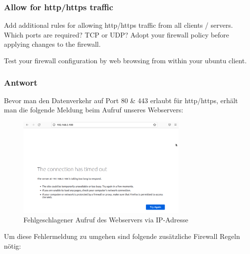 \documentclass{article}
\begin{document}
\subsubsection{Allow for http/https traffic}

Add additional rules for allowing http/https traffic from all clients / servers. 
Which ports are required? TCP or UDP? Adopt your firewall policy before applying 
changes to the firewall.

Test your firewall configuration by web browsing from within your ubuntu client. 

\subsubsection*{Antwort}

Bevor man den Datenverkehr auf Port 80 \& 443 erlaubt für http/https, erhält man die 
folgende Meldung beim Aufruf unseres Webservers:

\begin{figure}[H]
	\includegraphics[width=0.75\textwidth]{images/05}
	\centering
	\caption{Fehlgeschlagener Aufruf des Webservers via IP-Adresse}
\end{figure}

Um diese Fehlermeldung zu umgehen sind folgende zusätzliche Firewall Regeln nötig:

\begin{center}
\end{center}
\end{document}
